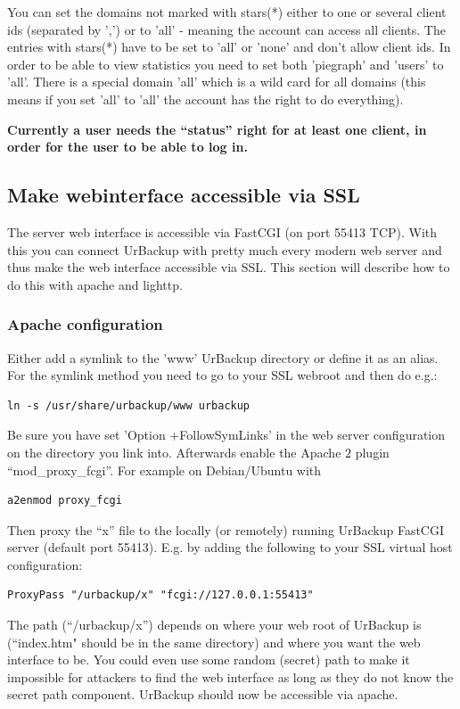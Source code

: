 \documentclass[a4paper,10pt]{article}
\begin{document}
You can set the domains not marked with stars(*) either to one or several client ids (separated by ',') or to 'all' - meaning the account can access all clients. The entries with stars(*) have to be set to 'all' or 'none' and don't allow client ids. In order to be able to view statistics you need to set both 'piegraph' and 'users' to 'all'. There is a special domain 'all' which is a wild card for all domains (this means if you set 'all' to 'all' the account has the right to do everything).

\textbf{Currently a user needs the ``status'' right for at least one client, in order for the user to be able to log in.}

\subsection{Make webinterface accessible via SSL}
\label{sec_webinterface_ssl}

The server web interface is accessible via FastCGI (on port 55413 TCP). With this you can connect UrBackup with pretty much every modern web server and thus make the web interface accessible via SSL. This section will describe how to do this with apache and lighttp.

\subsubsection{Apache configuration}
\label{subsub_apache}

Either add a symlink to the 'www' UrBackup directory or define it as an alias. 
For the symlink method you need to go to your SSL webroot and then do e.g.:
\begin{verbatim}
ln -s /usr/share/urbackup/www urbackup
\end{verbatim}
Be sure you have set 'Option +FollowSymLinks' in the web server configuration on the directory you link into. 
Afterwards enable the Apache $2$ plugin ``mod\_proxy\_fcgi''. For example on Debian/Ubuntu with
\begin{verbatim}
a2enmod proxy_fcgi
\end{verbatim}
Then proxy the ``x'' file to the locally (or remotely) running UrBackup FastCGI server (default port 55413).
E.g. by adding the following to your SSL virtual host configuration:
\begin{verbatim}
ProxyPass "/urbackup/x" "fcgi://127.0.0.1:55413"
\end{verbatim}
The path (``/urbackup/x'') depends on where your web root of UrBackup is (``index.htm" should be in the same directory)
and where you want the web interface to be. You could even use some random (secret) path to make it impossible for attackers to find the web interface as long as they do not know the secret path component. UrBackup should now be accessible via apache.
\end{document}
